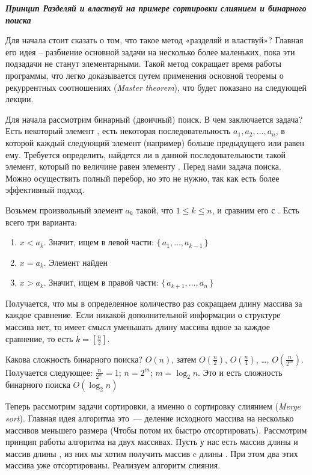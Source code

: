 \documentclass [a4paper,12pt] {report} 	%
\begin{document}
\begin{center}
{\Large \bfseries \slshape Принцип \glqq Разделяй и властвуй\grqq{} на примере сортировки слиянием и бинарного поиска}
\end{center}

Для начала стоит сказать о том, что такое метод «разделяй и властвуй»? Главная его идея – разбиение основной задачи на несколько более маленьких, пока эти подзадачи не станут элементарными. Такой метод сокращает время работы программы, что легко доказывается путем применения основной теоремы о рекуррентных соотношениях ({\slshape Master theorem}), что будет показано на следующей лекции.

Для начала рассмотрим бинарный (двоичный) поиск. В чем заключается задача? Есть некоторый элемент \grqq{}, есть некоторая последовательность $a_{1}, a_{2},\ldots, a_{n}$, в которой каждый следующий элемент (например) больше предыдущего или равен ему. Требуется определить, найдется ли в данной последовательности такой элемент, который по величине равен элементу \grqq{}. Перед нами задача поиска. Можно осуществить полный перебор, но это не нужно, так как есть более эффективный подход.

Возьмем произвольный элемент $a_{k}$ такой, что $1 \le k \le n$, и сравним его с \grqq{}. Есть всего три варианта:

\begin{enumerate}
  \item $x < a_{k}$. Значит, ищем в левой части: $\{\,a_{1},\ldots,a_{k-1}\,\}$
  \item $x = a_{k}$. Элемент найден
  \item $x > a_{k}$. Значит, ищем в правой части: $\{\,a_{k+1},\ldots,a_{n}\,\}$
\end{enumerate}

Получается, что мы в определенное количество раз сокращаем длину массива за каждое сравнение. Если никакой дополнительной информации о структуре массива нет, то имеет смысл уменьшать длину массива вдвое за каждое сравнение, то есть $k = [\frac {n}{2}]$.

Какова сложность бинарного поиска? $O(n)$, затем $O(\frac{n}{2})$, $O(\frac{n}{4})$, \ldots , $O(\frac{n}{2^{m}})$. Получается следующее: $\frac{n}{2^{m}}=1$; $n=2^{m}$; $m=\log_{2}n$. Это и есть сложность бинарного поиска $O(\log_{2}n)$

Теперь рассмотрим задачи сортировки, а именно о сортировку слиянием ({\slshape Merge sort}). Главная идея алгоритма это~--- деление исходного массива на несколько массивов меньшего размера (Чтобы потом их быстро отсортировать). Рассмотрим принцип работы алгоритма на двух массивах. Пусть у нас есть массив \grqq{} длины \grqq{} и массив \grqq{} длины \grqq{}, из них мы хотим получить массив c длины \grqq{}. При этом два этих массива уже отсортированы. Реализуем алгоритм слияния.
\end{document}
